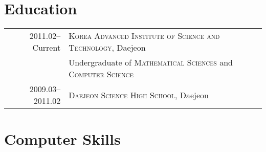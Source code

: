 \documentclass[a4paper,10pt]{article}
\begin{document}
\section{Education}
\begin{tabular}{rl}
  2011.02--Current & \textsc{Korea Advanced Institute of Science and Technology}, Daejeon \\
  & Undergraduate of \textsc{Mathematical Sciences} and \textsc{Computer Science} \\
  2009.03--2011.02 & \textsc{Daejeon Science High School}, Daejeon
\end{tabular}


\section{Computer Skills}


\end{document}

